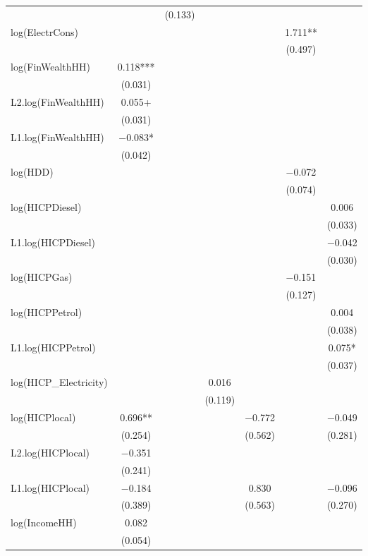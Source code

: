 \begin{table}
{\begin{tabular}[t]{lcccccc}
 &  & (\num{0.133}) &  &  &  & \\
log(ElectrCons) &  &  &  &  & \num{1.711}** & \\
 &  &  &  &  & (\num{0.497}) & \\
log(FinWealthHH) & \num{0.118}*** &  &  &  &  & \\
 & (\num{0.031}) &  &  &  &  \vphantom{1} & \\
L2.log(FinWealthHH) & \num{0.055}+ &  &  &  &  & \\
 & (\num{0.031}) &  &  &  &  & \\
L1.log(FinWealthHH) & \num{-0.083}* &  &  &  &  & \\
 & (\num{0.042}) &  &  &  &  & \\
log(HDD) &  &  &  &  & \num{-0.072} & \\
 &  &  &  &  & (\num{0.074}) & \\
log(HICPDiesel) &  &  &  &  &  & \num{0.006}\\
 &  &  &  &  &  & (\num{0.033})\\
L1.log(HICPDiesel) &  &  &  &  &  & \num{-0.042}\\
 &  &  &  &  &  & (\num{0.030})\\
log(HICPGas) &  &  &  &  & \num{-0.151} & \\
 &  &  &  &  & (\num{0.127}) & \\
log(HICPPetrol) &  &  &  &  &  & \num{0.004}\\
 &  &  &  &  &  & (\num{0.038})\\
L1.log(HICPPetrol) &  &  &  &  &  & \num{0.075}*\\
 &  &  &  &  &  & (\num{0.037})\\
log(HICP\_Electricity) &  &  & \num{0.016} &  &  & \\
 &  &  & (\num{0.119}) &  &  & \\
log(HICPlocal) & \num{0.696}** &  &  & \num{-0.772} &  & \num{-0.049}\\
 & (\num{0.254}) &  &  & (\num{0.562}) &  & (\num{0.281})\\
L2.log(HICPlocal) & \num{-0.351} &  &  &  &  & \\
 & (\num{0.241}) &  &  &  &  & \\
L1.log(HICPlocal) & \num{-0.184} &  &  & \num{0.830} &  & \num{-0.096}\\
 & (\num{0.389}) &  &  & (\num{0.563}) &  & (\num{0.270})\\
log(IncomeHH) & \num{0.082} &  &  &  &  & \\
 & (\num{0.054}) &  &  &  &  & \\

\end{tabular}}
\end{table}
